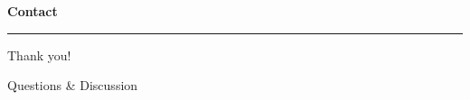 \documentclass[aspectratio=169, 11pt]{beamer}
\begin{document}
{
\begin{frame}[plain]
    \centering
    \vspace{1.6cm}
    {\LARGE\textbf{Contact}\par}
    \vspace{0.3cm}
    \textcolor{AccentBlue}{\rule{0.22\textwidth}{2.2pt}}
    \vspace{0.5cm}

    {\large Thank you!\par}
    \vspace{0.25cm}
    {\normalsize\textcolor{white!70!SlateDark}{Questions \& Discussion}\par}
\end{frame}
}
\end{document}
